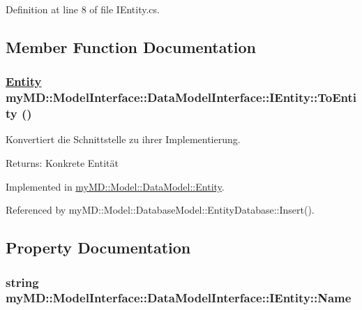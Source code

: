 Definition at line 8 of file IEntity.cs.

\subsection{Member Function Documentation}
\hypertarget{interfacemy_m_d_1_1_model_interface_1_1_data_model_interface_1_1_i_entity_1a8b26c73ec083d6930f1f39ce916df3}{
\subsubsection[ToEntity]{\setlength{\rightskip}{0pt plus 5cm}\hyperlink{classmy_m_d_1_1_model_1_1_data_model_1_1_entity}{Entity} my\-MD::Model\-Interface::Data\-Model\-Interface::IEntity::To\-Entity ()}}
\label{d2/d64/interfacemy_m_d_1_1_model_interface_1_1_data_model_interface_1_1_i_entity_1a8b26c73ec083d6930f1f39ce916df3}


Konvertiert die Schnittstelle zu ihrer Implementierung. 

\begin{Desc}
\item[Returns:]Konkrete Entit\"{a}t\end{Desc}


Implemented in \hyperlink{classmy_m_d_1_1_model_1_1_data_model_1_1_entity_1a8b26c73ec083d6930f1f39ce916df3}{my\-MD::Model::Data\-Model::Entity}.

Referenced by my\-MD::Model::Database\-Model::Entity\-Database::Insert().

\subsection{Property Documentation}
\hypertarget{interfacemy_m_d_1_1_model_interface_1_1_data_model_interface_1_1_i_entity_49ee3087348e8d44e1feda1917443987}{
\subsubsection[Name]{\setlength{\rightskip}{0pt plus 5cm}string my\-MD::Model\-Interface::Data\-Model\-Interface::IEntity::Name}}
\label{d2/d64/interfacemy_m_d_1_1_model_interface_1_1_data_model_interface_1_1_i_entity_49ee3087348e8d44e1feda1917443987}


